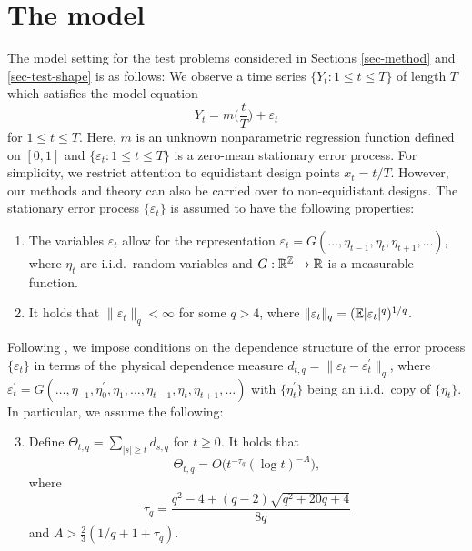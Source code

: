 
\section{The model}\label{sec-model}


The model setting for the test problems considered in Sections \ref{sec-method} and \ref{sec-test-shape} is as follows: We observe a time series $\{Y_t: 1 \le t \le T \}$ of length $T$ which satisfies the model equation 
\begin{equation}\label{model1}
Y_t = m \Big( \frac{t}{T} \Big) + \varepsilon_t 
\end{equation}
for $1 \le t \le T$. Here, $m$ is an unknown nonparametric regression function defined on $[0,1]$ and $\{ \varepsilon_t: 1 \le t \le T \}$ is a zero-mean stationary error process. For simplicity, we restrict attention to equidistant design points $x_t = t/T$. However, our methods and theory can also be carried over to non-equidistant designs. The stationary error process $\{\varepsilon_t\}$ is assumed to have the following properties: 
\begin{enumerate}[label=(C\arabic*),leftmargin=1.05cm]

\item \label{C-err1} The variables $\varepsilon_t$ allow for the representation $\varepsilon_t = G(\ldots,\eta_{t-1},\eta_t,\eta_{t+1},\ldots)$, where $\eta_t$ are i.i.d.\ random variables and $G: \mathbb{R}^{\mathbb{Z}} \rightarrow \mathbb{R}$ is a measurable function. 

\item \label{C-err2} It holds that $\| \varepsilon_t \|_q < \infty$ for some $q > 4$, where $\| \varepsilon_t \|_q = (\mathbb{E}|\varepsilon_t|^q)^{1/q}$. 

\end{enumerate}
Following \cite{Wu2005}, we impose conditions on the dependence structure of the error process $\{\varepsilon_t\}$ in terms of the physical dependence measure $d_{t,q} = \| \varepsilon_t - \varepsilon_t^\prime \|_q$, where $\varepsilon_t^\prime = G(\ldots,\eta_{-1},\eta_0^\prime,\eta_1,\ldots,\eta_{t-1},\eta_t,\eta_{t+1},\ldots)$ with $\{\eta_t^\prime\}$ being an i.i.d.\ copy of $\{\eta_t\}$. In particular, we assume the following: 
\begin{enumerate}[label=(C\arabic*),leftmargin=1.05cm]
\setcounter{enumi}{2}

\item \label{C-err3} Define $\Theta_{t,q} = \sum\nolimits_{|s| \ge t} d_{s,q}$ for $t \ge 0$. It holds that 
\[ \Theta_{t,q} = O \big( t^{-\tau_q} (\log t)^{-A} \big), \]
where
\[ \tau_q = \frac{q^2 - 4 + (q-2) \sqrt{q^2 + 20q + 4}}{8q} \]
and $A > \frac{2}{3} (1/q + 1 + \tau_q)$. 

\end{enumerate}
